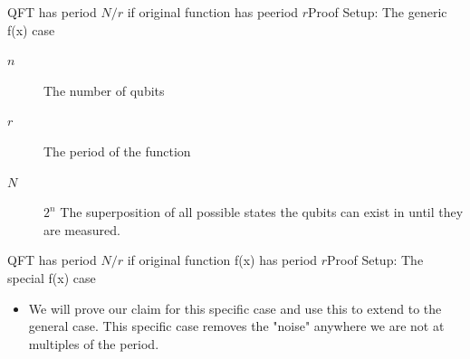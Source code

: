 {\begin{frame}{QFT has period $N/r$ if original function has peeriod $r$}{Proof Setup: The generic f(x) case}
\begin{description}
    
    \item [$n$] The number of qubits 
    \item [$r$]  The period of the function 
    \item [$N$]  $2^{n}$ The superposition of all possible states the qubits can exist in until they are measured.
   
\end{description}%
    
\end{frame}

\begin{frame}{QFT has period $N/r$ if original function f(x) has period $r$}{Proof Setup: The special f(x) case}
\Vskip{-3em}%
%
\Vskip{-1.5em}\begin{itemize}
    \item We will prove our claim for this specific case and use this to extend to the general case. This specific case removes the "noise" anywhere we are not at multiples of the period.


\end{itemize}
\end{frame}}
